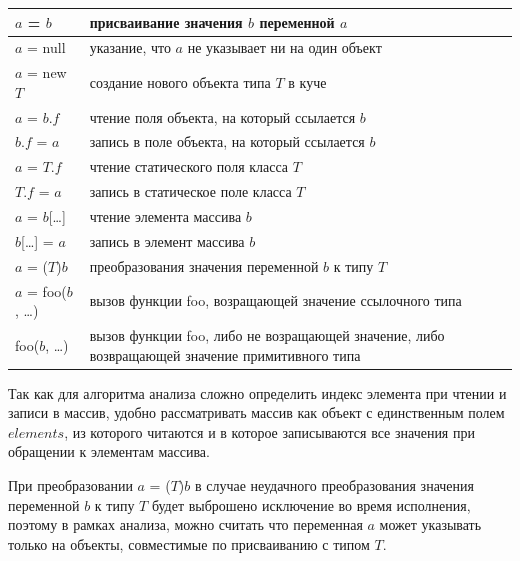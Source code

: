 \documentclass[14pt,titlepage]{extarticle}
\newenvironment{fresh}{\color{Blue}}{\color{black}}
\begin{document}
\begin{fresh}
\begin{center}
\begin{tabular}{|l|p{120mm}|}
          $a$ = $b$
          & присваивание значения $b$ переменной $a$ \\ \hline

          $a$ = null
          & указание, что $a$ не указывает ни на один объект \\ \hline

          $a$ = new $T$
          & создание нового объекта типа $T$ в куче \\ \hline

          $a$ = $b$.$f$
          & чтение поля объекта, на который ссылается $b$ \\ \hline

          $b$.$f$ = $a$
          & запись в поле объекта, на который ссылается $b$ \\ \hline

          $a$ = $T$.$f$
          & чтение статического поля класса $T$ \\ \hline

          $T$.$f$ = $a$
          & запись в статическое поле класса $T$ \\ \hline

          $a$ = $b$[\ldots]
          & чтение элемента массива $b$ \\ \hline

          $b$[\ldots] = $a$
          & запись в элемент массива $b$ \\ \hline

          $a$ = ($T$)$b$
          & преобразования значения переменной $b$ к типу $T$ \\ \hline

          $a$ = foo($b$, \ldots)
          & вызов функции foo, возращающей значение ссылочного типа \\ \hline

          foo($b$, \ldots)
          & вызов функции foo, либо не возращающей значение, либо возвращающей значение примитивного типа \\ \hline
        \end{tabular}
      \end{center}

      Так как для алгоритма анализа сложно определить индекс элемента при
      чтении и записи в массив, удобно рассматривать массив как объект с
      единственным полем $elements$, из которого читаются и в которое
      записываются все значения при обращении к элементам массива.

      При преобразовании $a$ = ($T$)$b$ в случае неудачного преобразования
      значения переменной $b$ к типу $T$ будет выброшено исключение во время
      исполнения, поэтому в рамках анализа, можно считать что переменная $a$
      может указывать только на объекты, совместимые по присваиванию с типом
      $T$.


\end{fresh}
\end{document}
